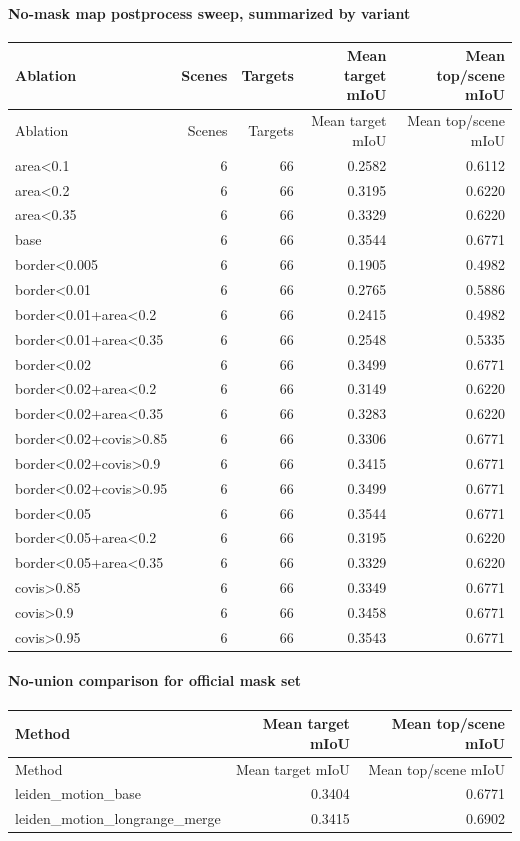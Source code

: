 \documentclass[10pt]{article}
\begin{document}
\paragraph{No-mask map postprocess sweep, summarized by variant}
\small
\begin{longtable}{lrrrr}
\toprule
Ablation & Scenes & Targets & Mean target mIoU & Mean top/scene mIoU \\
\midrule
\endfirsthead
\toprule
Ablation & Scenes & Targets & Mean target mIoU & Mean top/scene mIoU \\
\midrule
\endhead
area<0.1 & 6 & 66 & 0.2582 & 0.6112 \\
area<0.2 & 6 & 66 & 0.3195 & 0.6220 \\
area<0.35 & 6 & 66 & 0.3329 & 0.6220 \\
base & 6 & 66 & 0.3544 & 0.6771 \\
border<0.005 & 6 & 66 & 0.1905 & 0.4982 \\
border<0.01 & 6 & 66 & 0.2765 & 0.5886 \\
border<0.01+area<0.2 & 6 & 66 & 0.2415 & 0.4982 \\
border<0.01+area<0.35 & 6 & 66 & 0.2548 & 0.5335 \\
border<0.02 & 6 & 66 & 0.3499 & 0.6771 \\
border<0.02+area<0.2 & 6 & 66 & 0.3149 & 0.6220 \\
border<0.02+area<0.35 & 6 & 66 & 0.3283 & 0.6220 \\
border<0.02+covis>0.85 & 6 & 66 & 0.3306 & 0.6771 \\
border<0.02+covis>0.9 & 6 & 66 & 0.3415 & 0.6771 \\
border<0.02+covis>0.95 & 6 & 66 & 0.3499 & 0.6771 \\
border<0.05 & 6 & 66 & 0.3544 & 0.6771 \\
border<0.05+area<0.2 & 6 & 66 & 0.3195 & 0.6220 \\
border<0.05+area<0.35 & 6 & 66 & 0.3329 & 0.6220 \\
covis>0.85 & 6 & 66 & 0.3349 & 0.6771 \\
covis>0.9 & 6 & 66 & 0.3458 & 0.6771 \\
covis>0.95 & 6 & 66 & 0.3543 & 0.6771 \\
\bottomrule
\end{longtable}
\normalsize

\paragraph{No-union comparison for official mask set}
\small
\begin{longtable}{lrr}
\toprule
Method & Mean target mIoU & Mean top/scene mIoU \\
\midrule
\endfirsthead
\toprule
Method & Mean target mIoU & Mean top/scene mIoU \\
\midrule
\endhead
leiden\_motion\_base & 0.3404 & 0.6771 \\
leiden\_motion\_longrange\_merge & 0.3415 & 0.6902 \\
\bottomrule
\end{longtable}
\normalsize
\end{document}
